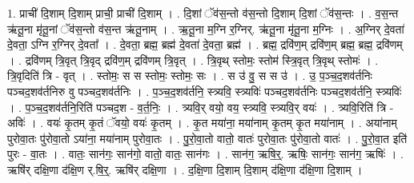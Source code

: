 \documentclass[17pt]{extarticle}
\begin{document}
1. प्राची॑ दि॒शाम् दि॒शाम् प्राची॒ प्राची॑ दि॒शाम् । . दि॒शां ॅव॑स॒न्तो व॑स॒न्तो दि॒शाम् दि॒शां ॅव॑स॒न्तः । . व॒स॒न्त ऋ॑तू॒ना मृ॑तू॒नां ॅव॑स॒न्तो व॑स॒न्त ऋ॑तू॒नाम् । . ऋ॒तू॒ना म॒ग्नि र॒ग्निर्. ऋ॑तू॒ना मृ॑तू॒ना म॒ग्निः । . अ॒ग्निर् दे॒वता॑ दे॒वता॒ ऽग्नि र॒ग्निर् दे॒वता᳚ । . दे॒वता॒ ब्रह्म॒ ब्रह्म॑ दे॒वता॑ दे॒वता॒ ब्रह्म॑ । . ब्रह्म॒ द्रवि॑ण॒म् द्रवि॑ण॒म् ब्रह्म॒ ब्रह्म॒ द्रवि॑णम् । . द्रवि॑णम् त्रि॒वृत् त्रि॒वृद् द्रवि॑ण॒म् द्रवि॑णम् त्रि॒वृत् । . त्रि॒वृथ् स्तोमः॒ स्तोम॑ स्त्रि॒वृत् त्रि॒वृथ् स्तोमः॑ । . त्रि॒वृदिति॑ त्रि - वृत् । . स्तोमः॒ स स स्तोमः॒ स्तोमः॒ सः । . स उ॑ वु॒ स स उ॑ । . उ॒ प॒ञ्च॒द॒शव॑र्तनिः पञ्चद॒शव॑र्तनिरु वु पञ्चद॒शव॑र्तनिः । . प॒ञ्च॒द॒शव॑र्तनि॒ स्त्र्यवि॒ स्त्र्यविः॑ पञ्चद॒शव॑र्तनिः पञ्चद॒शव॑र्तनि॒ स्त्र्यविः॑ । . प॒ञ्च॒द॒शव॑र्तनि॒रिति॑ पञ्चद॒श - व॒र्त॒निः॒ । . त्र्यवि॒र् वयो॒ वय॒ स्त्र्यवि॒ स्त्र्यवि॒र् वयः॑ । . त्र्यवि॒रिति॑ त्रि - अविः॑ । . वयः॑ कृ॒तम् कृ॒तं ॅवयो॒ वयः॑ कृ॒तम् । . कृ॒त मया॑ना॒ मया॑नाम् कृ॒तम् कृ॒त मया॑नाम् । . अया॑नाम् पुरोवा॒तः पु॑रोवा॒तो ऽया॑ना॒ मया॑नाम् पुरोवा॒तः । . पु॒रो॒वा॒तो वातो॒ वातः॑ पुरोवा॒तः पु॑रोवा॒तो वातः॑ । . पु॒रो॒वा॒त इति॑ पुरः - वा॒तः । . वातः॒ सान॑गः॒ सान॑गो॒ वातो॒ वातः॒ सान॑गः । . सान॑ग॒ ऋषि॒र्॒. ऋषिः॒ सान॑गः॒ सान॑ग॒ ऋषिः॑ । . ऋषि॑र् दक्षि॒णा द॑क्षि॒ण र्.षि॒र्॒. ऋषि॑र् दक्षि॒णा । . द॒क्षि॒णा दि॒शाम् दि॒शाम् द॑क्षि॒णा द॑क्षि॒णा दि॒शाम् । \newline
\end{document}
